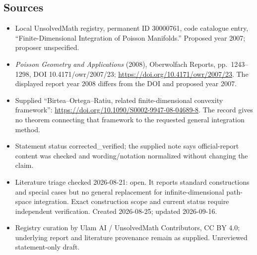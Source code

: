 \documentclass[11pt]{article}
\begin{document}
\subsection{Sources}
\begin{itemize}
\item Local UnsolvedMath registry, permanent ID 30000761, code catalogue entry, ``Finite-Dimensional Integration of Poisson Manifolds.'' Proposed year 2007; proposer unspecified.
\item \emph{Poisson Geometry and Applications} (2008), Oberwolfach Reports, pp.\ 1243--1298, DOI 10.4171/owr/2007/23; \url{https://doi.org/10.4171/owr/2007/23}. The displayed report year 2008 differs from the DOI and proposed year 2007.
\item Supplied ``Birtea--Ortega--Ratiu, related finite-dimensional convexity framework'': \url{https://doi.org/10.1090/S0002-9947-08-04689-8}. The record gives no theorem connecting that framework to the requested general integration method.
\item Statement status corrected\_verified; the supplied note says official-report content was checked and wording/notation normalized without changing the claim.
\item Literature triage checked 2026-08-21: open. It reports standard constructions and special cases but no general replacement for infinite-dimensional path-space integration. Exact construction scope and current status require independent verification. Created 2026-08-25; updated 2026-09-16.
\item Registry curation by Ulam AI / UnsolvedMath Contributors, CC BY 4.0; underlying report and literature provenance remain as supplied. Unreviewed statement-only draft.
\end{itemize}
\end{document}
